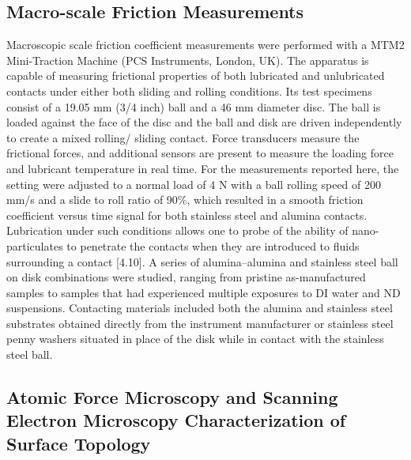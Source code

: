 \subsection{Macro-scale Friction Measurements}

Macroscopic scale friction coefficient measurements were performed with a MTM2 Mini-Traction Machine (PCS Instruments, London, UK). The apparatus is capable of measuring frictional properties of both lubricated and unlubricated contacts under either both sliding and rolling conditions. Its test specimens consist of a 19.05 mm (3/4 inch) ball and a 46 mm diameter disc. The ball is loaded against the face of the disc and the ball and disk are driven independently to create a mixed rolling/ sliding contact. Force transducers measure the frictional forces, and additional sensors are present to measure the loading force and lubricant temperature in real time. For the measurements reported here, the setting were adjusted to a normal load of 4 N with a ball rolling speed of 200 mm/s and a slide to roll ratio of 90\%, which resulted in a smooth friction coefficient versus time signal for both stainless steel and alumina contacts. Lubrication under such conditions allows one to probe of the ability of nano-particulates to penetrate the contacts when they are introduced to fluids surrounding a contact [4.10].
A series of alumina–alumina and stainless steel ball on disk combinations were studied, ranging from pristine as-manufactured samples to samples that had experienced multiple exposures to DI water and ND suspensions. Contacting materials included both the alumina and stainless steel substrates obtained directly from the instrument manufacturer or stainless steel penny washers situated in place of the disk while in contact with the stainless steel ball.

\subsection{Atomic Force Microscopy and Scanning Electron Microscopy Characterization of Surface Topology}


